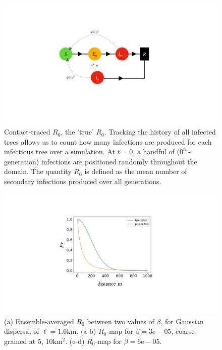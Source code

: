 \begin{figure}
    \centering
    \includegraphics[scale=0.30]{chapter6/figures/fig1.pdf}
    \caption{Contact-traced $R_0$, the 'true' $R_0$. Tracking the history of all infected trees allows us to count how many infections are produced for each infectious tree over a simulation. At $t=0$, a handful of ($0^{th}$-generation) infections are positioned randomly throughout the domain. The quantity $R_0$ is defined as the mean number of secondary infections produced over all generations.}
    \label{fig:my_label}
\end{figure}

\begin{figure}
    \centering
    \includegraphics[scale=0.25]{chapter6/figures/fig2.pdf}
      \caption{(a) Ensemble-averaged $R_0$ between two values of $\beta$, for Gaussian dispersal of $\ell=1.6\mathrm{km}$. (a-b) $R_0$-map for $\beta=3\mathrm{e}-05$, coarse-grained at $5$, $ 10\mathrm{km^2}$. (c-d) $R_0$-map for $\beta=6\mathrm{e}-05$.}
    \label{fig:my_label}
\end{figure}
